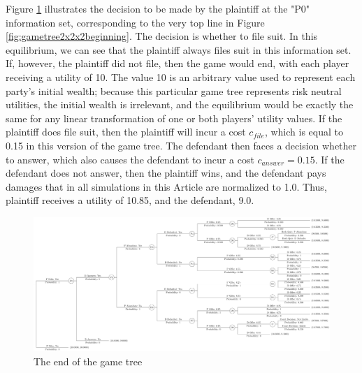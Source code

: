 \documentclass{article}
\begin{document}
Figure \ref{fig:gametree2x2x2end} illustrates the decision to be made by the plaintiff at the "P0" information set, corresponding to the very top line in Figure \ref{fig:gametree2x2x2beginning}. The decision is whether to file suit. In this equilibrium, we can see that the plaintiff always files suit in this information set. If, however, the plaintiff did not file, then the game would end, with each player receiving a utility of 10. The value 10 is an arbitrary value used to represent each party's initial wealth; because this particular game tree represents risk neutral utilities, the initial wealth is irrelevant, and the equilibrium would be exactly the same for any linear transformation of one or both players' utility values. If the plaintiff does file suit, then the plaintiff will incur a cost $c_{file}$, which is equal to 0.15 in this version of the game tree. The defendant then faces a decision whether to answer, which also causes the defendant to incur a cost $c_{answer}=0.15$. If the defendant does not answer, then the plaintiff wins, and the defendant pays damages that in all simulations in this Article are normalized to 1.0. Thus, plaintiff receives a utility of 10.85, and the defendant, 9.0.

\begin{figure}[h!]
\centering
\includegraphics[scale=0.25, trim={0in 0in 0in 0in}, clip]{../Figures/game tree 2x2x2 end.pdf}
\caption{The end of the game tree}
\label{fig:gametree2x2x2end}
\end{figure}
\end{document}
